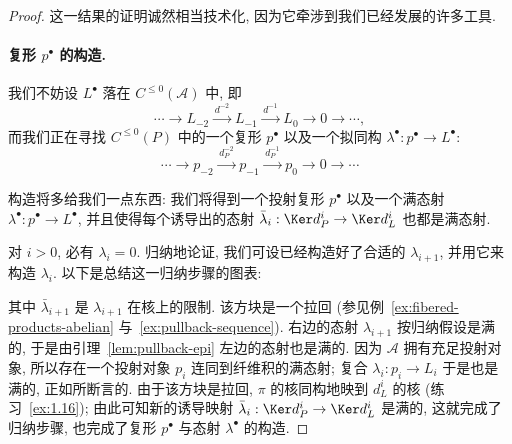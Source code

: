 \begin{proof}
这一结果的证明诚然相当技术化, 因为它牵涉到我们已经发展的许多工具.

\paragraph{复形 \texorpdfstring{$p^\bullet$}{pbullet} 的构造.} 我们不妨设 $L^\bullet$ 落在 $C^{\leq 0}(\mathcal{A})$ 中, 即
\[
\cdots\longrightarrow L_{-2}\xrightarrow{\,d^{-2}\,} L_{-1}\xrightarrow{\,d^{-1}\,} L_0\longrightarrow 0\longrightarrow\cdots,
\]
而我们正在寻找 $C^{\leq 0}(P)$ 中的一个复形 $p^\bullet$ 以及一个拟同构 $\lambda^\bullet:p^\bullet\to L^\bullet$:
\[
\cdots\longrightarrow p_{-2}\xrightarrow{\,d^{-2}_P\,} p_{-1}\xrightarrow{\,d^{-1}_P\,} p_0\longrightarrow 0\longrightarrow\cdots
\]
\begin{center}
\end{center}

构造将多给我们一点东西: 我们将得到一个投射复形 $p^\bullet$ 以及一个满态射 $\lambda^\bullet:p^\bullet\to L^\bullet$, 并且使得每个诱导出的态射 $\bar{\lambda}_i:\Ker d^i_P\to\Ker d^i_L$ 也都是满态射.

对 $i>0$, 必有 $\lambda_i=0$. 归纳地论证, 我们可设已经构造好了合适的 $\lambda_{i+1}$, 并用它来构造 $\lambda_i$. 以下是总结这一归纳步骤的图表:

\begin{center}
\end{center}

\noindent 其中 $\bar{\lambda}_{i+1}$ 是 $\lambda_{i+1}$ 在核上的限制. 该方块是一个拉回 (参见例~\ref{ex:fibered-products-abelian} 与~\ref{ex:pullback-sequence}). 右边的态射 $\lambda_{i+1}$ 按归纳假设是满的, 于是由引理~\ref{lem:pullback-epi} 左边的态射也是满的. 因为 $\mathcal{A}$ 拥有充足投射对象, 所以存在一个投射对象 $p_i$ 连同到纤维积的满态射; 复合 $\lambda_i:p_i\to L_i$ 于是也是满的, 正如所断言的. 由于该方块是拉回, $\pi$ 的核同构地映到 $d_L^i$ 的核 (练习~\ref{ex:1.16}); 由此可知新的诱导映射 $\bar{\lambda}_i:\Ker d^i_P\to\Ker d^i_L$ 是满的, 这就完成了归纳步骤, 也完成了复形 $p^\bullet$ 与态射 $\lambda^\bullet$ 的构造.


\end{proof}
